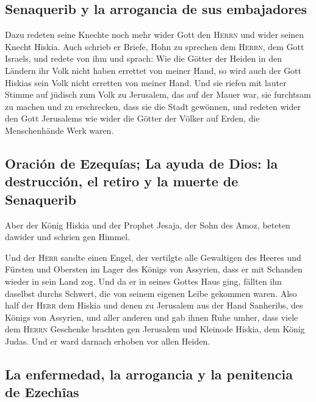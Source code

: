 \hypertarget{senaquerib-y-la-arrogancia-de-sus-embajadores}{%
\subsection{Senaquerib y la arrogancia de sus
embajadores}\label{senaquerib-y-la-arrogancia-de-sus-embajadores}}

 Dazu redeten seine Knechte noch mehr wider Gott den
\textsc{Herrn} und wider seinen Knecht Hiskia.  Auch
schrieb er Briefe, Hohn zu sprechen dem \textsc{Herrn}, dem Gott
Israels, und redete von ihm und sprach: Wie die Götter der Heiden in den
Ländern ihr Volk nicht haben errettet von meiner Hand, so wird auch der
Gott Hiskias sein Volk nicht erretten von meiner Hand. 
Und sie riefen mit lauter Stimme auf jüdisch zum Volk zu Jerusalem, das
auf der Mauer war, sie furchtsam zu machen und zu erschrecken, dass sie
die Stadt gewönnen,  und redeten wider den Gott
Jerusalems wie wider die Götter der Völker auf Erden, die Menschenhände
Werk waren.

\hypertarget{oraciuxf3n-de-ezequuxedas-la-ayuda-de-dios-la-destrucciuxf3n-el-retiro-y-la-muerte-de-senaquerib}{%
\subsection{Oración de Ezequías; La ayuda de Dios: la destrucción, el
retiro y la muerte de
Senaquerib}\label{oraciuxf3n-de-ezequuxedas-la-ayuda-de-dios-la-destrucciuxf3n-el-retiro-y-la-muerte-de-senaquerib}}

 Aber der König Hiskia und der Prophet Jesaja, der Sohn
des Amoz, beteten dawider und schrien gen Himmel.

 Und der \textsc{Herr} sandte einen Engel, der vertilgte
alle Gewaltigen des Heeres und Fürsten und Obersten im Lager des Königs
von Assyrien, dass er mit Schanden wieder in sein Land zog. Und da er in
seines Gottes Haus ging, fällten ihn daselbst durchs Schwert, die von
seinem eigenen Leibe gekommen waren.  Also half der
\textsc{Herr} dem Hiskia und denen zu Jerusalem aus der Hand Sanheribs,
des Königs von Assyrien, und aller anderen und gab ihnen Ruhe umher,
 dass viele dem \textsc{Herrn} Geschenke brachten gen
Jerusalem und Kleinode Hiskia, dem König Judas. Und er ward darnach
erhoben vor allen Heiden.

\hypertarget{la-enfermedad-la-arrogancia-y-la-penitencia-de-ezechuxeeas}{%
\subsection{La enfermedad, la arrogancia y la penitencia de
Ezechîas}\label{la-enfermedad-la-arrogancia-y-la-penitencia-de-ezechuxeeas}}

